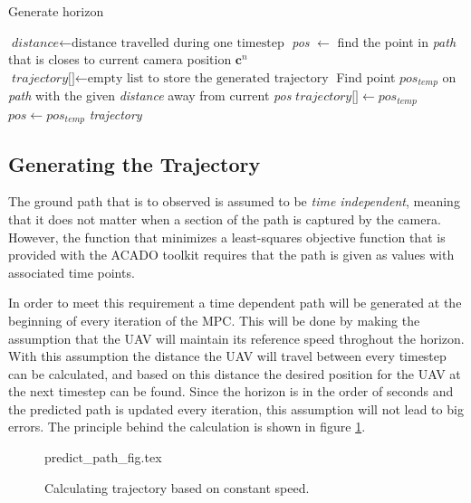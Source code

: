 \begin{algorithm}
\caption{Generate horizon}
\label{alg:genHor}
\begin{algorithmic}
	\State $\textit{distance} \gets \text{distance travelled during one timestep}$
	\State \textit{pos} $\gets$ find the point in \textit{path} that is closes to current camera position $\mathbf{c}^n$
	\State $\textit{trajectory[]} \gets \text{empty list to store the generated trajectory}$
		\State Find point \textit{$pos_{temp}$} on \textit{path} with the given \textit{distance} away from current \textit{pos}
		\State $\textit{trajectory[]} \gets pos_{temp}$
		\State $pos \gets pos_{temp}$
	\EndFor
	\Return \textit{trajectory}
\EndProcedure
\end{algorithmic}
\end{algorithm}


\subsection{Generating the Trajectory}

The ground path that is to observed is assumed to be \textit{time independent}, meaning that it does not matter when a section of the path is captured by the camera. However, the function that minimizes a least-squares objective function that is provided with the ACADO toolkit requires that the path is given as values with associated time points.

In order to meet this requirement a time dependent path will be generated at the beginning of every iteration of the MPC. This will be done by making the assumption that the UAV will maintain its reference speed throghout the horizon. With this assumption the distance the UAV will travel between every timestep can be calculated, and based on this distance the desired position for the UAV at the next timestep can be found. Since the horizon is in the order of seconds and the predicted path is updated every iteration, this assumption will not lead to big errors. The principle behind the calculation is shown in figure \ref{fig:predict_path}.

\begin{figure}
	{predict_path_fig.tex}
	\caption{Calculating trajectory based on constant speed.}
	\label{fig:predict_path}
\end{figure}